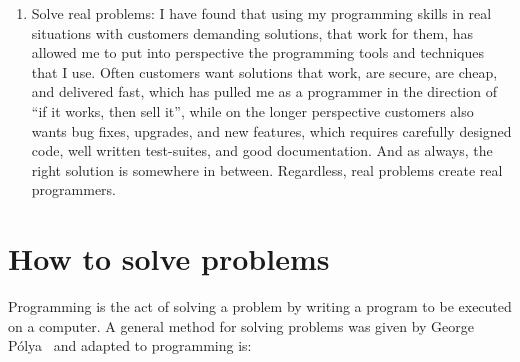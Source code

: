 \begin{enumerate}
\item Solve real problems: I have found that using my programming skills in real situations with customers demanding solutions, that work for them, has allowed me to put into perspective the programming tools and techniques that I use. Often customers want solutions that work, are secure, are cheap, and delivered fast, which has pulled me as a programmer in the direction of ``if it works, then sell it'', while on the longer perspective customers also wants bug fixes, upgrades, and new features, which requires carefully designed code, well written test-suites, and good documentation. And as always, the right solution is somewhere in between. Regardless, real problems create real programmers.
\end{enumerate}

\section{How to solve problems}
Programming is the act of solving a problem by writing a program to be executed on a computer. A general method for solving problems was given by George Pólya~\cite{polya45} and adapted to programming is:

